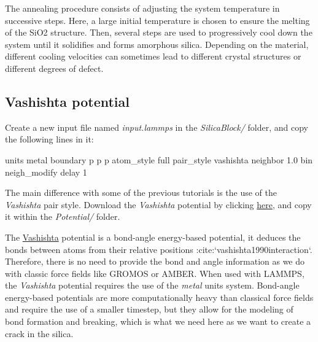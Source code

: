\begin{tcolorbox}[colback=mylightblue!5!white,colframe=mylightblue!75!black,title=About annealing procedure]

\vspace{0.25cm} \noindent The annealing procedure consists of adjusting the system temperature in successive steps.
Here, a large initial temperature is chosen to ensure the melting of the SiO2 structure.
Then, several steps are used to progressively cool down the system until it solidifies and forms 
amorphous silica. Depending on the material, different cooling velocities can sometimes
lead to different crystal structures or different degrees of defect.
\end{tcolorbox}

\subsection{Vashishta potential}
Create a new input file named \textit{input.lammps} in the \textit{SilicaBlock/} folder, and copy
the following lines in it:

\begin{lcverbatim}
units metal
boundary p p p
atom_style full
pair_style vashishta
neighbor 1.0 bin
neigh_modify delay 1
\end{lcverbatim}

\noindent The main difference with some of the previous tutorials is the use of 
the \textit{Vashishta} pair style. Download the \textit{Vashishta} potential by
clicking \href{https://lammpstutorials.github.io/lammpstutorials-inputs/level3/water-adsorption-in-silica/Potential/SiO.1990.vashishta}{here},
and copy it within the \textit{Potential/} folder.

\begin{tcolorbox}[colback=mylightblue!5!white,colframe=mylightblue!75!black,title=About the Vashishta potential]

\vspace{0.25cm} \noindent The \href{https://pubmed.ncbi.nlm.nih.gov/9993674/}{Vashishta}
potential is a bond-angle energy-based potential, it
deduces the bonds between atoms from their relative
positions :cite:`vashishta1990interaction`. Therefore, there is no need to
provide the bond and angle information as we do with classic force fields
like GROMOS or AMBER. When used with LAMMPS, the \textit{Vashishta}
potential requires the use of the \textit{metal} units system. 
Bond-angle energy-based potentials
are more computationally heavy than classical force
fields and require the use of a smaller timestep, but
they allow for the modeling of bond formation and
breaking, which is what we need here as we want to create
a crack in the silica.
\end{tcolorbox}


